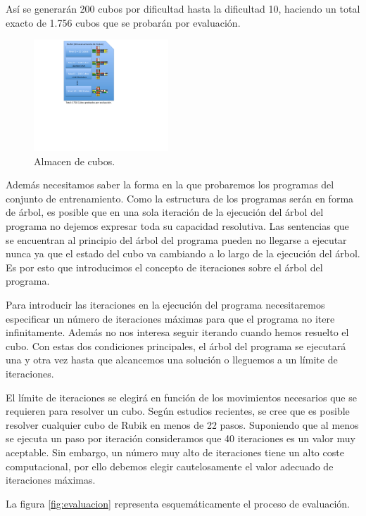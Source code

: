 Así se generarán 200 cubos por dificultad hasta la dificultad 10, haciendo un
total exacto de 1.756 cubos que se probarán por evaluación.

\begin{figure}[t]
\centering
\includegraphics[width=0.45\textwidth]{figs/pdf/cache}
\caption{Almacen de cubos.}
\label{fig:cache}
\end{figure}


Además necesitamos saber la forma en la que probaremos los programas del conjunto
de entrenamiento. Como la estructura de los programas serán en forma de árbol, es
posible que en una sola iteración de la ejecución del árbol del programa no
dejemos expresar toda su capacidad resolutiva. Las sentencias que se encuentran
al principio del árbol del programa pueden no llegarse a ejecutar nunca ya que el
estado del cubo va cambiando a lo largo de la ejecución del árbol. Es por esto
que introducimos el concepto de iteraciones sobre el árbol del programa.

Para introducir las iteraciones en la ejecución del programa necesitaremos
especificar un número de iteraciones máximas para que el programa no itere
infinitamente. Además no nos interesa seguir iterando cuando hemos resuelto el
cubo. Con estas dos condiciones principales, el árbol del programa se ejecutará
una y otra vez hasta que alcancemos una solución o lleguemos a un límite de
iteraciones.

El límite de iteraciones se elegirá en función de los movimientos necesarios que
se requieren para resolver un cubo. Según estudios recientes, se cree que es
posible resolver cualquier cubo de Rubik en menos de 22 pasos. Suponiendo que al
menos se ejecuta un paso por iteración consideramos que 40 iteraciones es un
valor muy aceptable. Sin embargo, un número muy alto de iteraciones tiene un alto
coste computacional, por ello debemos elegir cautelosamente el valor adecuado de
iteraciones máximas. 

La figura \ref{fig:evaluacion} representa esquemáticamente el proceso de
evaluación.

